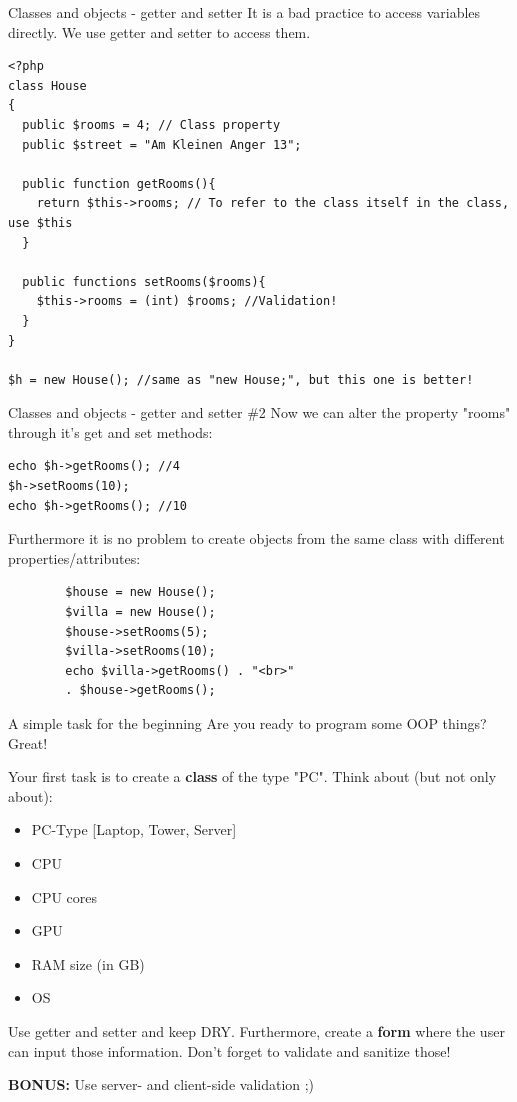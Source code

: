 \begin{frame}[fragile]{Classes and objects - getter and setter}
	It is a bad practice to access variables directly. We use getter and setter to access them. \pause
	\begin{lstlisting}
<?php
class House
{
  public $rooms = 4; // Class property
  public $street = "Am Kleinen Anger 13";
  
  public function getRooms(){
  	return $this->rooms; // To refer to the class itself in the class, use $this
  }
  
  public functions setRooms($rooms){
  	$this->rooms = (int) $rooms; //Validation!
  }
}

$h = new House(); //same as "new House;", but this one is better!
\end{lstlisting}
\end{frame}

\begin{frame}[fragile]{Classes and objects - getter and setter \#{}2}
	Now we can alter the property "rooms" through it's get and set methods:\pause
	\begin{lstlisting}
echo $h->getRooms(); //4
$h->setRooms(10);
echo $h->getRooms(); //10
\end{lstlisting}\pause
	Furthermore it is no problem to create objects from the same class with different properties/attributes:\pause
		\begin{lstlisting}
		$house = new House();
		$villa = new House();
		$house->setRooms(5);
		$villa->setRooms(10);
		echo $villa->getRooms() . "<br>" 
		. $house->getRooms();
		\end{lstlisting}
\end{frame}

\begin{frame}[fragile]{A simple task for the beginning}
	Are you ready to program some OOP things? Great! \pause
	
	Your first task is to create a \textbf{class} of the type "PC". Think about (but not only about): 
	\begin{itemize}
	\item PC-Type [Laptop, Tower, Server] \pause
	\item CPU \pause
	\item CPU cores \pause
	\item GPU \pause
	\item RAM size (in GB) \pause
	\item OS \pause
	\end{itemize}
	
	Use getter and setter and keep DRY. \pause
	Furthermore, create a \textbf{form} where the user can input those information. Don't forget to validate and sanitize those! \pause
	
	\textbf{BONUS:} Use server- and client-side validation ;)
\end{frame}

